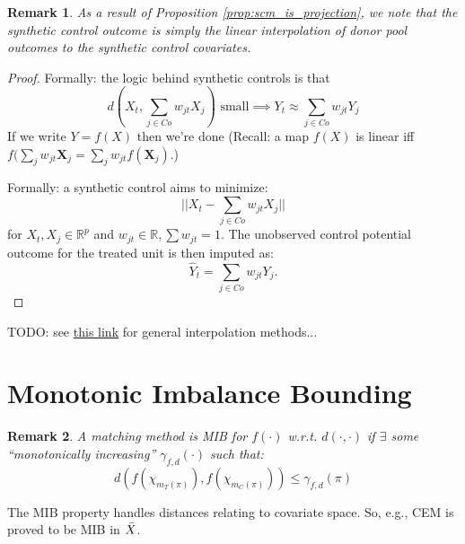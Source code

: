 \documentclass{article}
\newtheorem{remark}{Remark}
\newcommand{\Xj}{\mathbf{X}_j}
\begin{document}
\begin{remark}
As a result of Proposition \ref{prop:scm_is_projection}, we note that the synthetic control outcome is simply the linear interpolation of donor pool outcomes to the synthetic control covariates.
\end{remark}
\begin{proof}
    
    Formally: the logic behind synthetic controls is that
    \begin{equation*}
        d(X_t, \sum_{j \in Co} w_{jt} X_j) \text{ small}
        \implies Y_t \approx \sum_{j \in Co} w_{jt} Y_j
    \end{equation*}
    If we write $Y = f(X)$ then we're done (Recall: a map $f(X)$ is linear iff $f(\sum_j w_{jt} \Xj = \sum_j w_{jt} f(\Xj)$.)
    
    Formally: a synthetic control aims to minimize:
    \begin{equation*}
        ||X_t - \sum_{j \in Co} w_{jt} X_j||
    \end{equation*}
    for $X_t, X_j \in \mathbb{R}^p$ and $w_{jt} \in \mathbb{R}, \sum w_{jt} = 1$.
    The unobserved control potential outcome for the treated unit is then imputed as:
    \begin{equation*}
        \hat{Y}_t = \sum_{j \in Co} w_{jt} Y_j.
    \end{equation*}
\end{proof}

TODO: see \href{https://en.wikipedia.org/wiki/Multivariate_interpolation#Irregular_grid_(scattered_data)}{this link} for general interpolation methods...


\section{Monotonic Imbalance Bounding}
\label{app:mib}

\begin{remark}
    A matching method is MIB for $f(\cdot)$ w.r.t. $d(\cdot, \cdot)$ if $\exists$ some ``monotonically increasing'' $\gamma_{f,d}(\cdot)$  such that:
    $$d(f(\chi_{m_T(\pi)}), f(\chi_{m_C(\pi)})) \leq \gamma_{f,d}(\pi)$$
\end{remark}
The MIB property handles distances relating to covariate space.
So, e.g., CEM is proved to be MIB in $\Bar{X}$.
\end{document}

